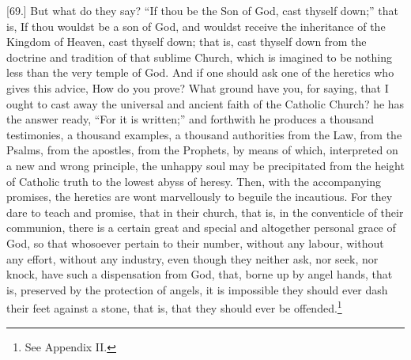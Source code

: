 [69.] But what do they say? “If thou be the Son of God, cast thyself down;” that is, If thou wouldst be a son of God, and wouldst receive the inheritance of the Kingdom of Heaven, cast thyself down; that is, cast thyself down from the doctrine and tradition of that sublime Church, which is imagined to be nothing less than the very temple of God. And if one should ask one of the heretics who gives this advice, How do you prove? What ground have you, for saying, that I ought to cast away the universal and ancient faith of the Catholic Church? he has the answer ready, “For it is written;” and forthwith he produces a thousand testimonies, a thousand examples, a thousand authorities from the Law, from the Psalms, from the apostles, from the Prophets, by means of which, interpreted on a new and wrong principle, the unhappy soul may be precipitated from the height of Catholic truth to the lowest abyss of heresy. Then, with the accompanying promises, the heretics are wont marvellously to beguile the incautious. For they dare to teach and promise, that in their church, that is, in the conventicle of their communion, there is a certain great and special and altogether personal grace of God, so that whosoever pertain to their number, without any labour, without any effort, without any industry, even though they neither ask, nor seek, nor knock, have such a dispensation from God, that, borne up by angel hands, that is, preserved by the protection of angels, it is impossible they should ever dash their feet against a stone, that is, that they should ever be offended.\footnote{See Appendix II.}


